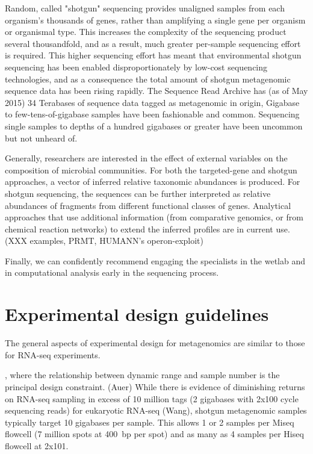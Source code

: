 \documentclass[graybox]{svmult}
\begin{document}
Random, called "shotgun" sequencing provides unaligned samples from each organism's thousands of genes, rather than amplifying a single gene per organism or organismal type.  This increases the complexity of the sequencing product several thousandfold, and as a result, much greater per-sample sequencing effort is required.
This higher sequencing effort has meant that environmental shotgun sequencing has been enabled disproportionately by low-cost sequencing technologies, and as a consequence the total amount of shotgun metagenomic sequence data has been rising rapidly.   The Sequence Read Archive has (as of May 2015) 34 Terabases of sequence data tagged as metagenomic in origin, 
Gigabase to few-tens-of-gigabase samples have been fashionable and common.  Sequencing single samples to depths of a hundred gigabases or greater have been uncommon but not unheard of.

Generally, researchers are interested in the effect of external variables on the composition of microbial communities.  For both the targeted-gene and shotgun approaches, a vector of inferred relative taxonomic abundances is produced.  For shotgun sequencing, the sequences can be further interpreted as relative abundances of fragments from different functional classes of genes.  Analytical approaches that use additional information (from comparative genomics, or from chemical reaction networks) to extend the inferred profiles are in current use.  (XXX examples, PRMT, HUMANN's operon-exploit)

Finally, we can confidently recommend engaging the specialists in the wetlab and in computational analysis early in the sequencing process.  
\section{Experimental design guidelines}
\label{sec:2}

The general aspects of experimental design for metagenomics are similar to those for RNA-seq experiments.  

, where the relationship between dynamic range and sample number is the principal design constraint. (Auer)    While there is evidence of diminishing returns on RNA-seq sampling in excess of 10 million tags (2 gigabases with 2x100 cycle sequencing reads) for eukaryotic RNA-seq (Wang), shotgun metagenomic samples typically target 10 gigabases per sample.     This allows 1 or 2 samples per Miseq flowcell  (7 million spots at 400~bp per spot) and as many as 4 samples per Hiseq flowcell at 2x101.
\end{document}
